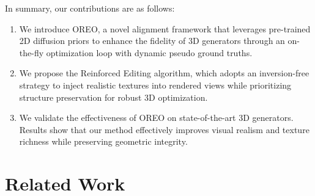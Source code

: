 \documentclass[runningheads]{llncs}
\begin{document}
In summary, our contributions are as follows:
\begin{enumerate}
    \item We introduce OREO, a novel alignment framework that leverages pre-trained 2D diffusion priors to enhance the fidelity of 3D generators through an on-the-fly optimization loop with dynamic pseudo ground truths.
    \item We propose the Reinforced Editing algorithm, which adopts an inversion-free strategy to inject realistic textures into rendered views while prioritizing structure preservation for robust 3D optimization.
    \item We validate the effectiveness of OREO on state-of-the-art 3D generators. Results show that our method effectively improves visual realism and texture richness while preserving geometric integrity.
\end{enumerate}

\section{Related Work}
\label{sec:related_work}
\end{document}
